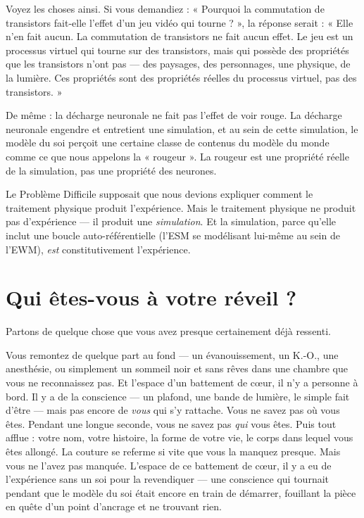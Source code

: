 \documentclass[11pt, twoside, openright]{book}
\begin{document}
Voyez les choses ainsi. Si vous demandiez : « Pourquoi la commutation de transistors fait-elle l'effet d'un jeu vidéo qui tourne ? », la réponse serait : « Elle n'en fait aucun. La commutation de transistors ne fait aucun effet. Le jeu est un processus virtuel qui tourne sur des transistors, mais qui possède des propriétés que les transistors n'ont pas --- des paysages, des personnages, une physique, de la lumière. Ces propriétés sont des propriétés réelles du processus virtuel, pas des transistors. »

De même : la décharge neuronale ne fait pas l'effet de voir rouge. La décharge neuronale engendre et entretient une simulation, et au sein de cette simulation, le modèle du soi perçoit une certaine classe de contenus du modèle du monde comme ce que nous appelons la « rougeur ». La rougeur est une propriété réelle de la simulation, pas une propriété des neurones.

Le Problème Difficile supposait que nous devions expliquer comment le traitement physique produit l'expérience. Mais le traitement physique ne produit pas d'expérience --- il produit une \textit{simulation}. Et la simulation, parce qu'elle inclut une boucle auto-référentielle (l'ESM se modélisant lui-même au sein de l'EWM), \textit{est} constitutivement l'expérience.

\section*{Qui êtes-vous à votre réveil ?}

Partons de quelque chose que vous avez presque certainement déjà ressenti.

Vous remontez de quelque part au fond --- un évanouissement, un K.-O., une anesthésie, ou simplement un sommeil noir et sans rêves dans une chambre que vous ne reconnaissez pas. Et l'espace d'un battement de cœur, il n'y a personne à bord. Il y a de la conscience --- un plafond, une bande de lumière, le simple fait d'être --- mais pas encore de \textit{vous} qui s'y rattache. Vous ne savez pas où vous êtes. Pendant une longue seconde, vous ne savez pas \textit{qui} vous êtes. Puis tout afflue : votre nom, votre histoire, la forme de votre vie, le corps dans lequel vous êtes allongé. La couture se referme si vite que vous la manquez presque. Mais vous ne l'avez pas manquée. L'espace de ce battement de cœur, il y a eu de l'expérience sans un soi pour la revendiquer --- une conscience qui tournait pendant que le modèle du soi était encore en train de démarrer, fouillant la pièce en quête d'un point d'ancrage et ne trouvant rien.
\end{document}
